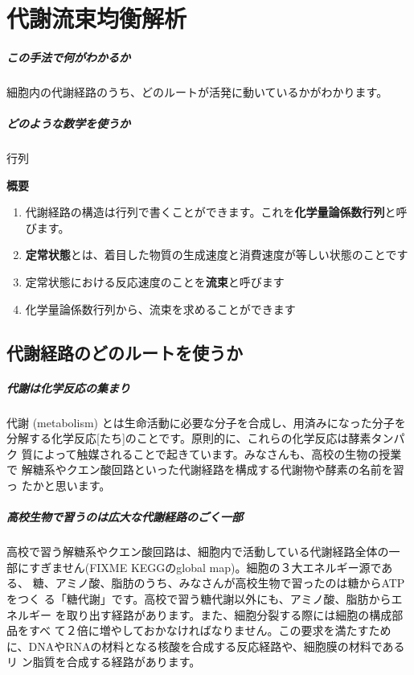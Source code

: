 \chapter{代謝流束均衡解析}
\paragraph{この手法で何がわかるか}
細胞内の代謝経路のうち、どのルートが活発に動いているかがわかります。

\paragraph{どのような数学を使うか}
行列

\begin{center}
{\bf 概要}
\end{center}

\begin{enumerate}
\item 代謝経路の構造は行列で書くことができます。これを{\bf 化学量論係数行列}と呼びます。
\item {\bf 定常状態}とは、着目した物質の生成速度と消費速度が等しい状態のことです
\item 定常状態における反応速度のことを{\bf 流束}と呼びます
\item 化学量論係数行列から、流束を求めることができます
\end{enumerate}

\section{代謝経路のどのルートを使うか}
\paragraph{代謝は化学反応の集まり} 
代謝 (metabolism) とは生命活動に必要な分子を合成し、用済みになった分子を
分解する化学反応[たち]のことです。原則的に、これらの化学反応は酵素タンパク
質によって触媒されることで起きています。みなさんも、高校の生物の授業で
解糖系やクエン酸回路といった代謝経路を構成する代謝物や酵素の名前を習っ
たかと思います。

\paragraph{高校生物で習うのは広大な代謝経路のごく一部} 
高校で習う解糖系やクエン酸回路は、細胞内で活動している代謝経路全体の一
部にすぎません(FIXME KEGGのglobal map)。細胞の３大エネルギー源である、
糖、アミノ酸、脂肪のうち、みなさんが高校生物で習ったのは糖からATPをつく
る「糖代謝」です。高校で習う糖代謝以外にも、アミノ酸、脂肪からエネルギー
を取り出す経路があります。また、細胞分裂する際には細胞の構成部品をすべ
て２倍に増やしておかなければなりません。この要求を満たすため
に、DNAやRNAの材料となる核酸を合成する反応経路や、細胞膜の材料であるリ
ン脂質を合成する経路があります。

